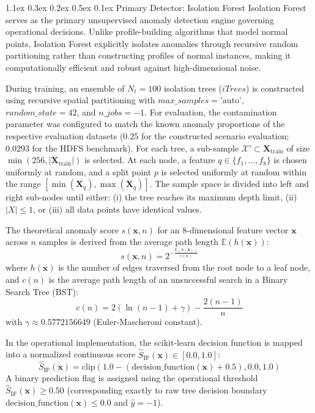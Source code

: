 \documentclass[10pt,conference]{IEEEtran}
\makeatletter
\renewcommand\subsection{\@startsection{subsection}{2}{\z@}%
  {1.1ex \@plus 0.3ex \@minus 0.2ex}%
  {0.5ex \@plus 0.1ex}%
  {\normalfont\fontsize{12pt}{14.4pt}\selectfont\bfseries}}
\makeatother
\begin{document}
\subsection{Primary Detector: Isolation Forest}
Isolation Forest serves as the primary unsupervised anomaly detection engine governing operational decisions. Unlike profile-building algorithms that model normal points, Isolation Forest explicitly isolates anomalies through recursive random partitioning rather than constructing profiles of normal instances, making it computationally efficient and robust against high-dimensional noise.

During training, an ensemble of $N_t = 100$ isolation trees ($iTrees$) is constructed using recursive spatial partitioning with $max\_samples = \text{'auto'}$, $random\_state = 42$, and $n\_jobs = -1$. For evaluation, the contamination parameter was configured to match the known anomaly proportions of the respective evaluation datasets ($0.25$ for the constructed scenario evaluation; $0.0293$ for the HDFS benchmark). For each tree, a sub-sample $\mathcal{X}' \subset \mathbf{X}_{\text{train}}$ of size $\min(256, |\mathbf{X}_{\text{train}}|)$ is selected. At each node, a feature $q \in \{f_1, \dots, f_8\}$ is chosen uniformly at random, and a split point $p$ is selected uniformly at random within the range $[\min(\mathbf{X}_q), \max(\mathbf{X}_q)]$. The sample space is divided into left and right sub-nodes until either: (i) the tree reaches its maximum depth limit, (ii) $|X| \le 1$, or (iii) all data points have identical values.

The theoretical anomaly score $s(\mathbf{x}, n)$ for an 8-dimensional feature vector $\mathbf{x}$ across $n$ samples is derived from the average path length $\mathbb{E}(h(\mathbf{x}))$:
\begin{equation}
s(\mathbf{x}, n) = 2^{-\frac{\mathbb{E}(h(\mathbf{x}))}{c(n)}}
\label{eq_if_score}
\end{equation}
where $h(\mathbf{x})$ is the number of edges traversed from the root node to a leaf node, and $c(n)$ is the average path length of an unsuccessful search in a Binary Search Tree (BST):
\begin{equation}
c(n) = 2\left(\ln(n - 1) + \gamma\right) - \frac{2(n - 1)}{n}
\end{equation}
with $\gamma \approx 0.5772156649$ (Euler-Mascheroni constant).

In the operational implementation, the scikit-learn decision function is mapped into a normalized continuous score $\hat{S}_{\text{IF}}(\mathbf{x}) \in [0.0, 1.0]$:
\begin{equation}
\hat{S}_{\text{IF}}(\mathbf{x}) = \text{clip}\left(1.0 - \left(\text{decision\_function}(\mathbf{x}) + 0.5\right), 0.0, 1.0\right)
\label{eq_norm_score}
\end{equation}
A binary prediction flag is assigned using the operational threshold $\hat{S}_{\text{IF}}(\mathbf{x}) \ge 0.50$ (corresponding exactly to raw tree decision boundary $\text{decision\_function}(\mathbf{x}) \le 0.0$ and $\hat{y} = -1$).
\end{document}
